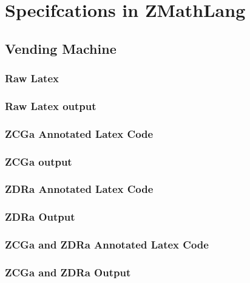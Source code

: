\chapter{Specifcations in ZMathLang}
\label{app:other}

\section{Vending Machine}
\label{app:vm}

\subsection{Raw Latex}
\label{app:vm0}

\subsection{Raw Latex output}
\label{app:vm0o}

\subsection{ZCGa Annotated Latex Code}
\label{app:vm1}

\subsection{ZCGa output}
\label{app:vm1o}

\subsection{ZDRa Annotated Latex Code}
\label{app:vm2}

\subsection{ZDRa Output}
\label{app:vm2o}

\subsection{ZCGa and ZDRa Annotated Latex Code}
\label{app:vm1n2}

\subsection{ZCGa and ZDRa Output}
\label{app:vm1n2o}

